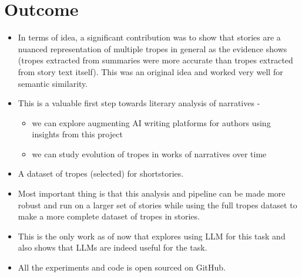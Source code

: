 \documentclass[11pt]{article}
\begin{document}
\section{Outcome}
\begin{itemize}
  \item In terms of idea, a significant contribution was to show that stories are a nuanced representation of multiple tropes in general as the evidence shows (tropes extracted from summaries were more accurate than tropes extracted from story text itself). This was an original idea and worked very well for semantic similarity.
  \item This is a valuable first step towards literary analysis of narratives -
  \begin{itemize}
    \item we can explore augmenting AI writing platforms for authors using insights from this project
    \item we can study evolution of tropes in works of narratives over time
  \end{itemize}
  \item A dataset of tropes (selected) for shortstories. 
  \item Most important thing is that this analysis and pipeline can be made more robust and run on a larger set of stories while using the full tropes dataset to make a more complete dataset of tropes in stories.
  \item This is the only work as of now that explores using LLM for this task and also shows that LLMs are indeed useful for the task. 
  \item All the experiments and code is open sourced on GitHub.
\end{itemize}
\end{document}
